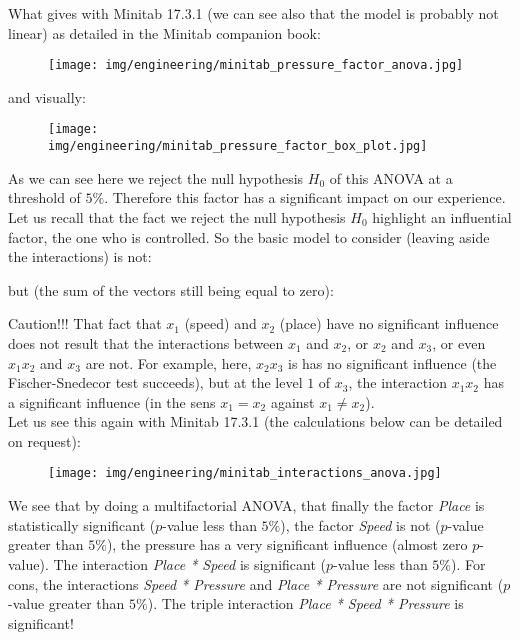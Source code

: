 	What gives with Minitab 17.3.1 (we can see also that the model is probably not linear) as detailed in the Minitab companion book:
	\begin{figure}[H]
		\begin{center}
		\texttt{[image: img/engineering/minitab\_pressure\_factor\_anova.jpg]}
		\end{center}	
	\end{figure}
	and visually:
	\begin{figure}[H]
		\begin{center}
		\texttt{[image: img/engineering/minitab\_pressure\_factor\_box\_plot.jpg]}
		\end{center}	
	\end{figure}

	As we can see here we reject the null hypothesis $H_0$ of this ANOVA at a threshold of $5\%$. Therefore this factor has a significant impact on our experience.\\
	
	Let us recall that the fact we reject the null hypothesis $H_0$ highlight an influential factor, the one who is controlled. So the basic model to consider (leaving aside the interactions) is not:
	
	but (the sum of the vectors still being equal to zero):
	
	Caution!!! That fact that $x_1$ (speed) and $x_2$ (place) have no significant influence does not result that the interactions between $x_1$ and $x_2$, or $x_2$ and $x_3$, or even $x_1x_2$ and $x_3$ are not. For example, here, $x_2x_3$ is has no significant influence (the Fischer-Snedecor test succeeds), but at the level $1$ of $x_3$, the interaction $x_1x_2$ has a significant influence (in the sens $x_1=x_2$ against $x_1\neq x_2$).\\

	Let us see this again with Minitab 17.3.1 (the calculations below can be detailed on request):
	\begin{figure}[H]
		\begin{center}
		\texttt{[image: img/engineering/minitab\_interactions\_anova.jpg]}
		\end{center}	
	\end{figure}
	We see that by doing a multifactorial ANOVA, that finally the factor \textit{Place} is statistically significant ($p$-value less than $5\%$), the factor \textit{Speed} is not ($p$-value greater than $5\%$), the pressure has a very significant influence (almost zero $p$-value). The interaction \textit{Place * Speed} is significant ($p$-value less than $5\%$). For cons, the interactions \textit{Speed * Pressure} and \textit{Place * Pressure} are not significant ($p$-value greater than $5\%$). The triple interaction \textit{Place * Speed * Pressure} is significant!\\
	
